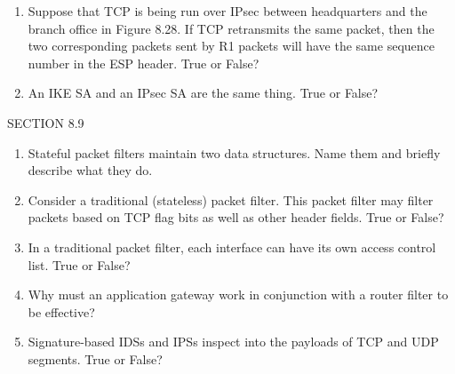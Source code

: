 \begin{enumerate}

\item  Suppose that TCP is being run over IPsec between headquarters and the branch office in Figure 8.28. If TCP retransmits the same packet, then the two corresponding packets sent by R1 packets will have the same sequence number in the ESP header. True or False? 


\item An IKE SA and an IPsec SA are the same thing. True or False?


\end{enumerate}

\newpage

\noindent SECTION 8.9

\begin{enumerate}

\item  Stateful packet filters maintain two data structures. Name them and briefly describe what they do.


\item  Consider a traditional (stateless) packet filter. This packet filter may filter packets based on TCP flag bits as well as other header fields. True or False?


\item In a traditional packet filter, each interface can have its own access control list. True or False?


\item Why must an application gateway work in conjunction with a router filter to be effective?


\item Signature-based IDSs and IPSs inspect into the payloads of TCP and UDP segments. True or False?


\end{enumerate}


